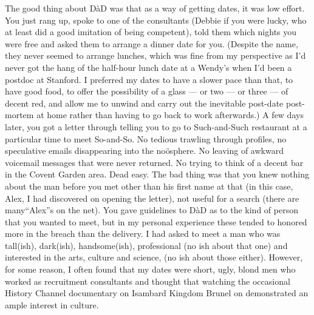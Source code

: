 The good thing about D{\`a}D was that as a
way of getting dates, it was low effort. You just rang up, spoke to
one of the consultants (Debbie if you were lucky, who at least did a
good imitation of being competent), told them which nights you were
free and asked them to arrange a dinner date for you. (Despite the
name, they never seemed to arrange lunches, which was fine from my
perspective as I'd never got the hang of the half-hour lunch date at a Wendy's when I'd been a postdoc at
Stanford. I preferred my dates to have a slower pace than that, to
have good food, to offer the possibility of a glass --- or two
--- or three --- of decent red, and allow me to unwind and carry out
the inevitable post-date post-mortem at home rather than having to
go back to work afterwards.) A few days later, you got a letter
through telling you to go to Such-and-Such restaurant at a
particular time to meet So-and-So. No tedious trawling through
profiles, no speculative emails disappearing into the no{\"o}sphere.
No leaving of awkward voicemail messages that were never returned. No
trying to think of a decent bar in the Covent Garden area. Dead
easy. The bad thing was that you knew nothing about the man before
you met other than his first name at that (in this case,
Alex, I had discovered on opening the letter), not useful
for a search (there are many``Alex''s on the net). You
gave guidelines to D{\`a}D as to the kind of person that
you wanted to meet, but in my personal experience these
tended to honored more in the breach than the delivery. I had asked
to meet a man who was tall(ish), dark(ish), handsome(ish),
professional (no ish about that one) and interested in the arts,
culture and science, ({\twelveit no\/} ish about those either).
However, for some reason, I often found that my dates were short,
ugly, blond men who worked as recruitment consultants and thought
that watching the occasional History Channel documentary on Isambard Kingdom
Brunel on demonstrated an ample interest in culture.

